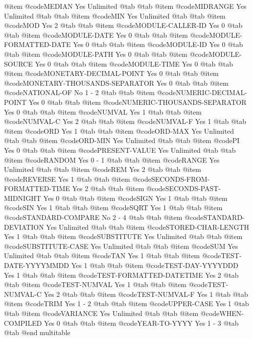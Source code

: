 @item @code{MEDIAN	Yes	Unlimited} @tab  @tab 
@item @code{MIDRANGE	Yes	Unlimited} @tab  @tab 
@item @code{MIN	Yes	Unlimited} @tab  @tab 
@item @code{MOD	Yes	2} @tab  @tab 
@item @code{MODULE-CALLER-ID	Yes	0} @tab  @tab 
@item @code{MODULE-DATE	Yes	0} @tab  @tab 
@item @code{MODULE-FORMATTED-DATE	Yes	0} @tab  @tab 
@item @code{MODULE-ID	Yes	0} @tab  @tab 
@item @code{MODULE-PATH	Yes	0} @tab  @tab 
@item @code{MODULE-SOURCE	Yes	0} @tab  @tab 
@item @code{MODULE-TIME	Yes	0} @tab  @tab 
@item @code{MONETARY-DECIMAL-POINT	Yes	0} @tab  @tab 
@item @code{MONETARY-THOUSANDS-SEPARATOR	Yes	0} @tab  @tab 
@item @code{NATIONAL-OF	No	1 - 2} @tab  @tab 
@item @code{NUMERIC-DECIMAL-POINT	Yes	0} @tab  @tab 
@item @code{NUMERIC-THOUSANDS-SEPARATOR	Yes	0} @tab  @tab 
@item @code{NUMVAL	Yes	1} @tab  @tab 
@item @code{NUMVAL-C	Yes	2} @tab  @tab 
@item @code{NUMVAL-F	Yes	1} @tab  @tab 
@item @code{ORD	Yes	1} @tab  @tab 
@item @code{ORD-MAX	Yes	Unlimited} @tab  @tab 
@item @code{ORD-MIN	Yes	Unlimited} @tab  @tab 
@item @code{PI	Yes	0} @tab  @tab 
@item @code{PRESENT-VALUE	Yes	Unlimited} @tab  @tab 
@item @code{RANDOM	Yes	0 - 1} @tab  @tab 
@item @code{RANGE	Yes	Unlimited} @tab  @tab 
@item @code{REM	Yes	2} @tab  @tab 
@item @code{REVERSE	Yes	1} @tab  @tab 
@item @code{SECONDS-FROM-FORMATTED-TIME	Yes	2} @tab  @tab 
@item @code{SECONDS-PAST-MIDNIGHT	Yes	0} @tab  @tab 
@item @code{SIGN	Yes	1} @tab  @tab 
@item @code{SIN	Yes	1} @tab  @tab 
@item @code{SQRT	Yes	1} @tab  @tab 
@item @code{STANDARD-COMPARE	No	2 - 4} @tab  @tab 
@item @code{STANDARD-DEVIATION	Yes	Unlimited} @tab  @tab 
@item @code{STORED-CHAR-LENGTH	Yes	1} @tab  @tab 
@item @code{SUBSTITUTE	Yes	Unlimited} @tab  @tab 
@item @code{SUBSTITUTE-CASE	Yes	Unlimited} @tab  @tab 
@item @code{SUM	Yes	Unlimited} @tab  @tab 
@item @code{TAN	Yes	1} @tab  @tab 
@item @code{TEST-DATE-YYYYMMDD	Yes	1} @tab  @tab 
@item @code{TEST-DAY-YYYYDDD	Yes	1} @tab  @tab 
@item @code{TEST-FORMATTED-DATETIME	Yes	2} @tab  @tab 
@item @code{TEST-NUMVAL	Yes	1} @tab  @tab 
@item @code{TEST-NUMVAL-C	Yes	2} @tab  @tab 
@item @code{TEST-NUMVAL-F	Yes	1} @tab  @tab 
@item @code{TRIM	Yes	1 - 2} @tab  @tab 
@item @code{UPPER-CASE	Yes	1} @tab  @tab 
@item @code{VARIANCE	Yes	Unlimited} @tab  @tab 
@item @code{WHEN-COMPILED	Yes	0} @tab  @tab 
@item @code{YEAR-TO-YYYY	Yes	1 - 3} @tab  @tab 
@end multitable
